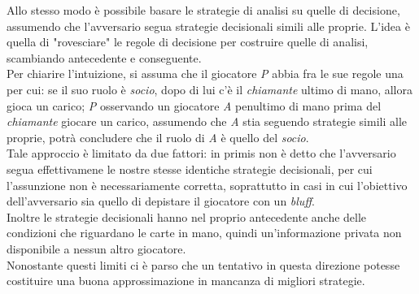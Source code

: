 Allo stesso modo è possibile basare le strategie di analisi su quelle di decisione, assumendo che l'avversario segua strategie decisionali simili alle proprie.
L'idea è quella di "rovesciare" le regole di decisione per costruire quelle di analisi, scambiando antecedente e conseguente.\\
Per chiarire l'intuizione, si assuma che il giocatore \emph{P} abbia fra le sue regole una per cui: se il suo ruolo è \emph{socio}, dopo di lui c'è il \emph{chiamante} ultimo di mano, allora gioca un carico; \emph{P} osservando un giocatore \emph{A} penultimo di mano prima del \emph{chiamante} giocare un carico, assumendo che \emph{A} stia seguendo strategie simili alle proprie, potrà concludere che il ruolo di \emph{A} è quello del \emph{socio}.\\
Tale approccio è limitato da due fattori: in primis non è detto che l'avversario segua effettivamene le nostre stesse identiche strategie decisionali, per cui l'assunzione non è necessariamente corretta, soprattutto in casi in cui l'obiettivo dell'avversario sia quello di depistare il giocatore con un \emph{bluff}.\\
Inoltre le strategie decisionali hanno nel proprio antecedente anche delle condizioni che riguardano le carte in mano, quindi un'informazione privata non disponibile a nessun altro giocatore.\\
Nonostante questi limiti ci è parso che un tentativo in questa direzione potesse costituire una buona approssimazione in mancanza di migliori strategie.\\





